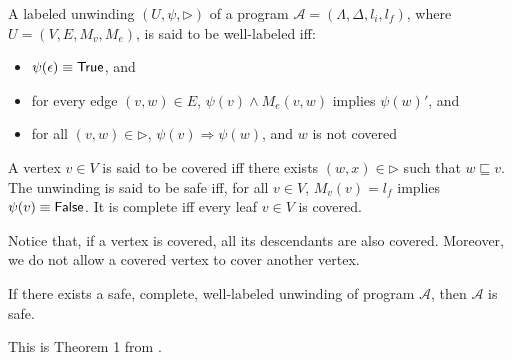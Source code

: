 \begin{defn}
  \label{defn:well-labeled-prog-unwinding}
  A labeled unwinding $(U, \psi, \rhd)$ of a program $\mathcal{A} = (\Lambda, \Delta, l_i, l_f)$, where $U = (V, E, M_v, M_e)$, is said to be well-labeled iff:

  \begin{itemize}
    \item $\psi(\epsilon) \equiv \mathsf{True}$, and
    \item for every edge $(v,w) \in E$, $\psi(v) \wedge M_e(v,w)$ implies $\psi(w)'$, and
    \item for all $(v,w) \in \rhd$, $\psi(v) \Rightarrow \psi(w)$, and $w$ is not covered
  \end{itemize}

  A vertex $v \in V$ is said to be covered iff there exists $(w,x) \in \rhd$ such that $w \sqsubseteq v$. The unwinding is said to be safe iff, for all $v \in V$, $M_v(v) = l_f$ implies $\psi(v) \equiv \mathsf{False}$. It is complete iff every leaf $v \in V$ is covered.
\end{defn}

Notice that, if a vertex is covered, all its descendants are also covered. Moreover, we do not allow a covered vertex to cover another vertex.

\begin{thm}
  If there exists a safe, complete, well-labeled unwinding of program $\mathcal{A}$, then $\mathcal{A}$ is safe.
\end{thm}

This is Theorem 1 from \cite{mcmillan06}.

